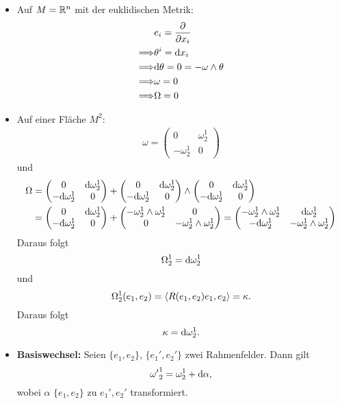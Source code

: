 \Bsp{}
\begin{itemize}
	\item Auf $M = \mathbb{R}^n$ mit der euklidischen Metrik:
	\begin{align*}
	&e_i = \frac{\partial }{\partial x_i}\\
	\overset{}{\Longrightarrow} & \theta^i = \text{d} x_i\\
	\overset{}{\Longrightarrow} & \text{d} \theta = 0 = -\omega \wedge \theta\\
	\overset{}{\Longrightarrow} & \omega = 0\\
	\overset{}{\Longrightarrow} & \Omega= 0
	\end{align*}
	\item Auf einer Fläche $M^2$:
	\begin{align*}
	\omega = \left(
	\begin{matrix}
	0 & \omega^1_2\\
	- \omega^1_2 & 0
	\end{matrix}
	\right)
	\end{align*}
	und
	\begin{align*}
	\Omega &= \left(
	\begin{matrix}
	0 & \text{d} \omega^1_2\\
	- \text{d} \omega^1_2 & 0
	\end{matrix}
	\right)
	+
	\left(
	\begin{matrix}
	0 & \text{d} \omega^1_2\\
	- \text{d} \omega^1_2 & 0
	\end{matrix}
	\right)
	\wedge
	\left(
	\begin{matrix}
	0 & \text{d} \omega^1_2\\
	- \text{d} \omega^1_2 & 0
	\end{matrix}
	\right)\\
	&= \left(
	\begin{matrix}
	0 & \text{d} \omega^1_2\\
	- \text{d} \omega^1_2 & 0
	\end{matrix}
	\right)
	+
	\left(
	\begin{matrix}
	- \omega^1_2\wedge \omega^1_2 & 0\\
	0 & -\omega^1_2 \wedge \omega^1_2
	\end{matrix}
	\right) = 
		\left(
	\begin{matrix}
	- \omega^1_2\wedge \omega^1_2 & \text{d} \omega_2^1\\
	-\text{d} \omega_2^1 & -\omega^1_2 \wedge \omega^1_2
	\end{matrix}
	\right) 
	\end{align*}
	Daraus folgt
	\[ \Omega^1_2 = \text{d} \omega_2^1 \]
	und
	\[ \Omega_2^1(e_1, e_2) = \left<R(e_1,e_2)e_1, e_2\right> = \kappa. \]
	Daraus folgt
	\[ \kappa = \text{d} \omega^1_2. \]
\item \textbf{Basiswechsel:} Seien $\{ e_1, e_2 \}$, $\{e_1', e_2'\}$ zwei Rahmenfelder.
Dann gilt
\[ {\omega'}_2^1 = \omega^1_2 + \text{d} \alpha, \]
wobei $\alpha$ $\{e_1, e_2\}$ zu $e_1', e_2'$ transformiert.
\end{itemize}


